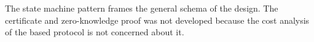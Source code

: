 
The state machine pattern frames the general schema of the design.
The certificate and zero-knowledge proof was not developed because the cost analysis of the based protocol is not concerned about it.
